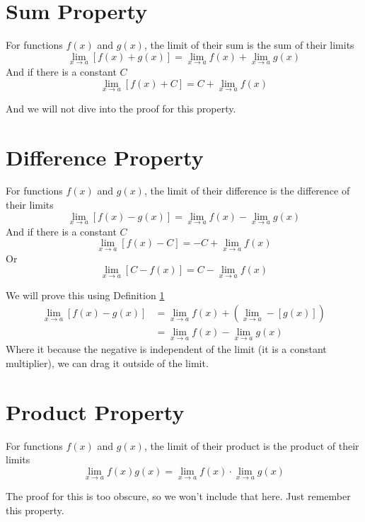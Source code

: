\documentclass[working]{tuftebook}
\begin{document}
\section{Sum Property}\label{def:sum-property}
\begin{definition}
    For functions $f(x)$ and $g(x)$, the limit of their sum is the sum of their limits 
    \[
        \lim_{x\to a} \left[ f(x)+g(x) \right]= \lim_{x\to a}f(x)+ \lim_{x\to a}g(x)
    \]
    And if there is a constant $C$
    \[
        \lim_{x\to a} \left[ f(x)+C \right]= C+\lim_{x\to a}f(x)
    \]
\end{definition}
And we will not dive into the proof for this property. 

\section{Difference Property}
\begin{definition}
    For functions $f(x)$ and $g(x)$, the limit of their difference is the difference of their limits 
    \[
        \lim_{x\to a} \left[ f(x)-g(x) \right]= \lim_{x\to a}f(x)- \lim_{x\to a}g(x)
    \]
    And if there is a constant $C$
    \[
        \lim_{x\to a} \left[ f(x)-C \right]=-C+ \lim_{x\to a}f(x)
    \]
    Or 
    \[
        \lim_{x\to a} \left[ C-f(x) \right]=C- \lim_{x\to a}f(x)
    \]
\end{definition}
\begin{myproof}
    We will prove this using Definition \ref{def:sum-property}
    \begin{align*}
        \lim_{x\to a} \left[ f(x)-g(x) \right]&= \lim_{x\to a}f(x)+ (\lim_{x\to a} -\left[ g(x) \right])\\
                                              &= \lim_{x\to a}f(x)- \lim_{x\to a}g(x)
    \end{align*}
    Where it because the negative is independent of the limit (it is a constant multiplier), we can drag it outside of the limit.
\end{myproof}

\newpage
\section{Product Property}\label{def:product}
\begin{definition}
    For functions $f(x)$ and $g(x)$, the limit of their product is the product of their limits 
    \[
        \lim_{x\to a}f(x)g(x)= \lim_{x\to a}f(x)\cdot \lim_{x\to a}g(x)
    \]
\end{definition}
The proof for this is too obscure, so we won't include that here. Just remember this property.
\end{document}
